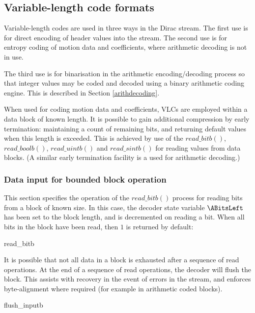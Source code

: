 \subsection{Variable-length code formats}
\label{vlc}
Variable-length codes are used in three ways in the Dirac stream. The first
use is for direct encoding of header values into the stream. The second use
is for entropy coding of motion data and coefficients, where arithmetic decoding
is not in use.

The third use 
is for binarisation in the arithmetic encoding/decoding process so that integer 
values may be coded and decoded using a binary arithmetic coding engine. This is
described in Section \ref{arithdecoding}.

When used for coding motion data and coefficients, VLCs are employed within
a data block of known length. It is possible to gain additional compression by early termination:
maintaining a count of remaining bits, and returning default values when this length
is exceeded. This is achieved by use of the $read\_bitb()$, $read\_boolb()$, 
$read\_uintb()$ and $read\_sintb()$ for reading values from data blocks. 
(A similar early termination facility is a used for arithmetic decoding.)

\subsubsection{Data input for bounded block operation}
\label{blockreadbit}

This section specifies the operation of the $read\_bitb()$ process for reading bits from
a block of known size. In this case, the decoder state variable $\ABitsLeft$ has been
set to the block length, and is decremented on reading a bit. When all bits in the block
have been read, then $1$ is returned by default:

\begin{pseudo}{read\_bitb}{}
\bsELSE
\bsEND
\end{pseudo}

It is possible that not all data in a block is exhausted after a sequence of read operations.
At the end of a sequence of read operations, the decoder will flush the block. This assists
with recovery in the event of errors in the stream, and enforces byte-alignment where required 
(for example in arithmetic coded blocks).

\begin{pseudo}{flush\_inputb}{}
\bsEND
\end{pseudo}



